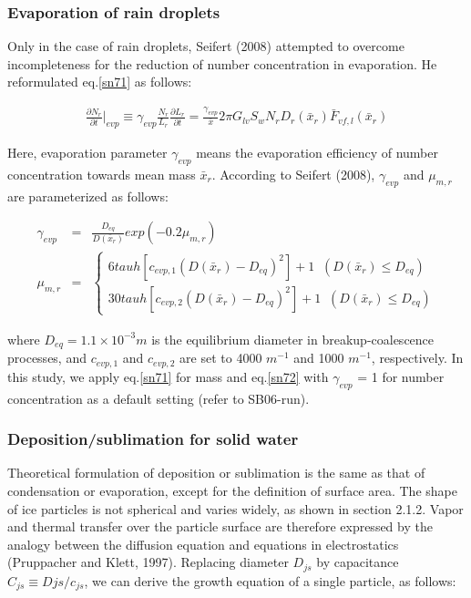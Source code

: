 \subsubsection{Evaporation of rain droplets}
Only in the case of rain droplets, Seifert (2008) attempted to overcome incompleteness for the reduction of number concentration in evaporation. He reformulated eq.\ref{sn71} as follows:

\begin{eqnarray}
\frac{\partial N_{r}}{\partial t}\Bigr|_{evp}\equiv \gamma_{evp}\frac{N_{r}}{L_{r}}\frac{\partial L_{r}}{\partial t}=\frac{\gamma_{evp}}{\bar{x}}2\pi G_{lv}S_{w}N_{r}D_{r}(\bar{x}_{r})\bar{F}_{vf,l}(\bar{x}_{r})\label{sn72}
\end{eqnarray}

Here, evaporation parameter $\gamma_{evp}$ means the evaporation efficiency of number concentration towards mean mass $\bar{x}_{r}$. According to Seifert (2008), $\gamma_{evp}$ and $\mu_{m,r}$ are parameterized as follows:

\begin{eqnarray}
\gamma_{evp}&=&\frac{D_{eq}}{D(\bar{x}_{r})}exp(-0.2\mu_{m,r})\label{sn73}\\
\mu_{m,r}&=&
\left\{
\begin{array}{l}
6tauh[{c_{evp,1}(D(\bar{x}_{r})-D_{eq})}^{2}]+1\;\;(D(\bar{x}_{r})\leq D_{eq}) \\
30tauh[{c_{evp,2}(D(\bar{x}_{r})-D_{eq})}^{2}]+1\;\;(D(\bar{x}_{r})\leq D_{eq})
\label{sn74}
\end{array}
\right.
\end{eqnarray}

where $D_{eq} = 1.1 \times 10^{-3} m$ is the equilibrium diameter in breakup-coalescence processes, and $c_{evp,1}$ and $c_{evp,2}$ are set to 4000 $m^{-1}$ and 1000 $m^{-1}$, respectively. In this study, we apply eq.\ref{sn71} for mass and eq.\ref{sn72} with $\gamma_{evp}$ = 1 for number concentration as a default setting (refer to SB06-run).

\subsubsection{Deposition/sublimation for solid water}
Theoretical formulation of deposition or sublimation is the same as that of condensation or evaporation, except for the definition of surface area. The shape of ice particles is not spherical and varies widely, as shown in section 2.1.2. Vapor and thermal transfer over the particle surface are therefore expressed by the analogy between the diffusion equation and equations in electrostatics (Pruppacher and Klett, 1997). Replacing diameter $D_{js}$ by capacitance $C_{js}\equiv D{js}/c_{js}$, we can derive the growth equation of a single particle, as follows:

